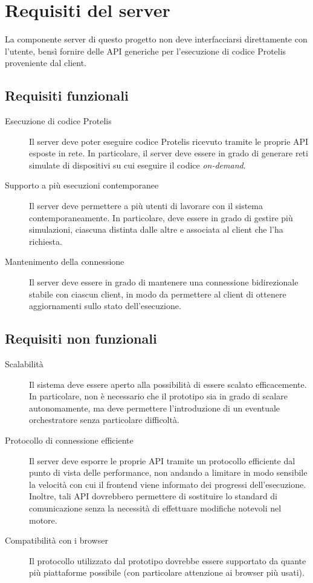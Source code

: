   \section{Requisiti del server}
    La componente server di questo progetto non deve interfacciarsi direttamente con l'utente, bensì fornire delle API generiche per l'esecuzione di codice Protelis proveniente dal client.

    \subsection{Requisiti funzionali}

    \begin{description}
      \item[Esecuzione di codice Protelis]
        Il server deve poter eseguire codice Protelis ricevuto tramite le proprie API esposte in rete.
        In particolare, il server deve essere in grado di generare reti simulate di dispositivi su cui eseguire il codice \emph{on-demand}.
      \item[Supporto a più esecuzioni contemporanee]
        Il server deve permettere a più utenti di lavorare con il sistema contemporaneamente.
        In particolare, deve essere in grado di gestire più simulazioni, ciascuna distinta dalle altre e associata al client che l'ha richiesta.
      \item[Mantenimento della connessione]
        Il server deve essere in grado di mantenere una connessione bidirezionale stabile con ciascun client, in modo da permettere al client di ottenere aggiornamenti sullo stato dell'esecuzione.
    \end{description}

    \subsection{Requisiti non funzionali}

    \begin{description}
      \item[Scalabilità]
        Il sistema deve essere aperto alla possibilità di essere scalato efficacemente.
        In particolare, non è necessario che il prototipo sia in grado di scalare autonomamente, ma deve permettere l'introduzione di un eventuale orchestratore senza particolare difficoltà.

      \item[Protocollo di connessione efficiente]
        Il server deve esporre le proprie API tramite un protocollo efficiente dal punto di vista delle performance, non andando a limitare in modo sensibile la velocità con cui il frontend viene informato dei progressi dell'esecuzione.
        Inoltre, tali API dovrebbero permettere di sostituire lo standard di comunicazione senza la necessità di effettuare modifiche notevoli nel motore.

      \item[Compatibilità con i browser]
        Il protocollo utilizzato dal prototipo dovrebbe essere supportato da quante più piattaforme possibile (con particolare attenzione ai browser più usati).
    \end{description}

